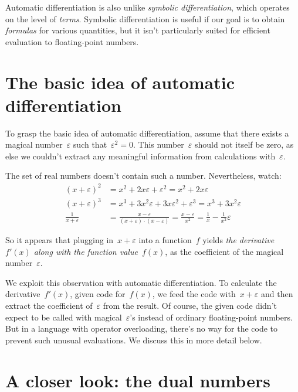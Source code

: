 \documentclass[a4paper,ngerman,12pt]{scrartcl}
\theoremstyle{definition}
\theoremstyle{plain}
\theoremstyle{remark}
\begin{document}
Automatic differentiation is also unlike \emph{symbolic differentiation},
which operates on the level of \emph{terms}. Symbolic differentiation is useful
if our goal is to obtain \emph{formulas} for various quantities, but it isn't
particularly suited for efficient evaluation to floating-point numbers.


\section{The basic idea of automatic differentiation}

To grasp the basic idea of automatic differentiation, assume that there exists
a magical number~$\varepsilon$ such that~$\varepsilon^2 = 0$. This
number~$\varepsilon$ should not itself be zero, as else we couldn't extract any
meaningful information from calculations with~$\varepsilon$.

The set of real numbers doesn't contain such a number. Nevertheless, watch:
\begin{align*}
  (x+\varepsilon)^2 &= x^2 + 2x\varepsilon + \varepsilon^2 = x^2 + 2x\varepsilon \\[0.6em]
  (x+\varepsilon)^3 &= x^3 + 3x^2\varepsilon + 3x\varepsilon^2 + \varepsilon^3 = x^3 + 3x^2\varepsilon \\[0.6em]
  \frac{1}{x+\varepsilon} &= \frac{x-\varepsilon}{(x+\varepsilon) \cdot
  (x-\varepsilon)} = \frac{x-\varepsilon}{x^2} = \frac{1}{x} - \frac{1}{x^2}
  \varepsilon
\end{align*}

So it appears that plugging in~$x + \varepsilon$ into a function~$f$ yields
\emph{the derivative~$f'(x)$ along with the function value~$f(x)$}, as the
coefficient of the magical number~$\varepsilon$.

We exploit this observation with automatic differentiation. To calculate the
derivative~$f'(x)$, given code for~$f(x)$, we feed the code with~$x +
\varepsilon$ and then extract the coefficient of~$\varepsilon$ from the result.
Of course, the given code didn't expect to be called with
magical~$\varepsilon$'s instead of ordinary floating-point numbers. But in a
language with operator overloading, there's no way for the code to prevent such
unusual evaluations. We discuss this in more detail below.


\section{A closer look: the dual numbers}
\end{document}
